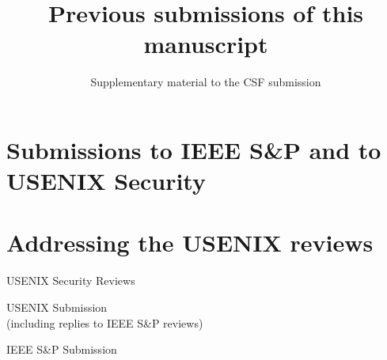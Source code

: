 \documentclass[a4paper]{scrartcl}
\title{Previous submissions of this manuscript}
\subtitle{Supplementary material to the CSF submission}
\date{}
\author{}
\begin{document}
  \maketitle

\section*{Submissions to IEEE S\&P and to USENIX Security}

\section*{Addressing the USENIX reviews}

\newpage
\vspace*{7cm}
\begin{center}
  \textsf{
\Huge{USENIX Security Reviews}
}
\end{center}
\newpage









\newpage
\vspace*{7cm}
\begin{center}
  \textsf{
\Huge{USENIX Submission}\\
\large{(including replies to IEEE S\&P reviews)}
}
\end{center}
\newpage



\newpage
\vspace*{7cm}
\begin{center}
  \textsf{
\Huge{IEEE S\&P Submission}\\
}
\end{center}
\newpage


\end{document}
